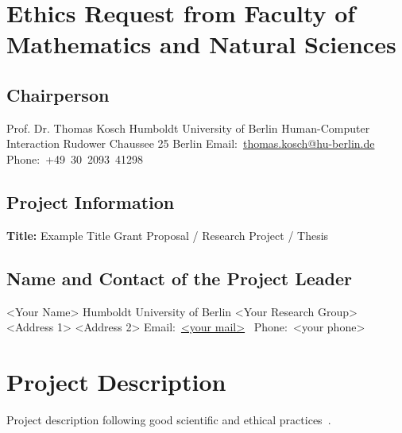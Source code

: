 \documentclass[letterpaper]{article}
\title{}
\author{<YOUR NAME>}
\date{\today}
\newcommand\textstyleHyperlink[1]{\textcolor[rgb]{0.019607844,0.3882353,0.75686276}{#1}}
\begin{document}
\clearpage\clearpage\pagestyle{MP}
\section{Ethics Request from Faculty of Mathematics and Natural Sciences}

\bigskip

\subsection{Chairperson}
Prof. Dr. Thomas Kosch\newline
Humboldt University of Berlin\newline
Human-Computer Interaction\newline
Rudower Chaussee 25 Berlin\newline
Email:\ \href{mailto:thomas.kosch@hu-berlin.de}{\textstyleHyperlink{thomas.kosch@hu-berlin.de}}\newline
Phone:\ +49\ 30\ 2093\ 41298


\bigskip

\subsection{Project Information}
{\bfseries Title:} Example Title \newline
{} Grant Proposal / Research Project / Thesis

\subsection{Name and Contact of the Project Leader}
<Your Name>\newline
Humboldt University of Berlin\newline
<Your Research Group>\newline
<Address 1>\newline
<Address 2>\newline
Email:\ \href{mailto:<your mail>}{\textstyleHyperlink{<your mail>}}\ \newline
\textcolor[rgb]{0.2,0.2,0.2}{Phone:\ }<your phone>

\clearpage

\section{Project Description}
Project description following good scientific and ethical practices~\cite{greene2019better}.
\end{document}
